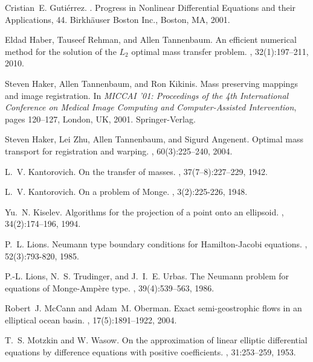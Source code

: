 \documentclass{amsart}
\theoremstyle{lemma}
\theoremstyle{remark}
\begin{document}
\begin{thebibliography}{CKKSE97}
Cristian~E. Guti{\'e}rrez.
.
\newblock Progress in Nonlinear Differential Equations and their Applications,
  44. Birkh\"auser Boston Inc., Boston, MA, 2001.

Eldad Haber, Tauseef Rehman, and Allen Tannenbaum.
\newblock An efficient numerical method for the solution of the {$L_2$} optimal
  mass transfer problem.
, 32(1):197--211, 2010.

Steven Haker, Allen Tannenbaum, and Ron Kikinis.
\newblock Mass preserving mappings and image registration.
\newblock In {\em MICCAI '01: Proceedings of the 4th International Conference
  on Medical Image Computing and Computer-Assisted Intervention}, pages
  120--127, London, UK, 2001. Springer-Verlag.

Steven Haker, Lei Zhu, Allen Tannenbaum, and Sigurd Angenent.
\newblock Optimal mass transport for registration and warping.
, 60(3):225--240, 2004.

L.~V. Kantorovich.
\newblock On the transfer of masses.
, 37(7--8):227--229, 1942.

L.~V. Kantorovich.
\newblock On a problem of {M}onge.
, 3(2):225-226, 1948.

Yu.~N. Kiselev.
\newblock Algorithms for the projection of a point onto an ellipsoid.
, 34(2):174--196, 1994.

P.~L. Lions.
\newblock Neumann type boundary conditions for {H}amilton-{J}acobi equations.
, 52(3):793-820, 1985.

P.-L. Lions, N.~S. Trudinger, and J.~I.~E. Urbas.
\newblock The {N}eumann problem for equations of {M}onge-{A}mp\`ere type.
, 39(4):539--563, 1986.

Robert~J. McCann and Adam~M. Oberman.
\newblock Exact semi-geostrophic flows in an elliptical ocean basin.
, 17(5):1891--1922, 2004.

T.~S. Motzkin and W. Wasow.
\newblock On the approximation of linear elliptic differential equations by difference equations with positive coefficients.
, 31:253--259, 1953.


\end{thebibliography}
\end{document}
